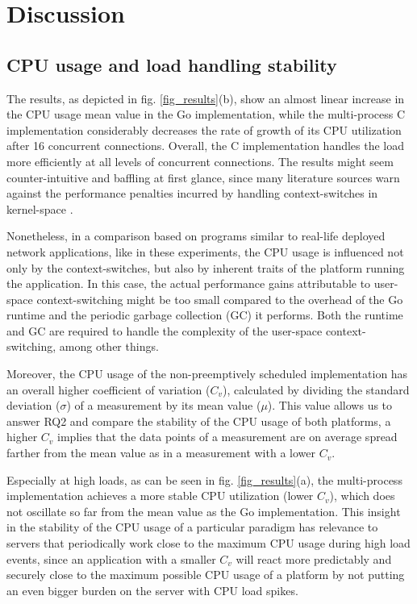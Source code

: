 \section{Discussion}
\subsection{CPU usage and load handling stability}
The results, as depicted in fig. \ref{fig_results}(b), show an almost linear increase in the CPU usage mean value in the Go implementation, while the multi-process C implementation considerably decreases the rate of growth of its CPU utilization after 16 concurrent connections. Overall, the C implementation handles the load more efficiently at all levels of concurrent connections. The results might seem counter-intuitive and baffling at first glance, since many literature sources warn against the performance penalties incurred by handling context-switches in kernel-space \cite{Cox-Buday2017}\cite{Kerrisk2010}. 

Nonetheless, in a comparison based on programs similar to real-life deployed network applications, like in these experiments, the CPU usage is influenced not only by the context-switches, but also by inherent traits of the platform running the application. In this case, the actual performance gains attributable to user-space context-switching might be too small compared to the overhead of the Go runtime and the periodic garbage collection (GC) it performs. Both the runtime and GC are required to handle the complexity of the user-space context-switching, among other things.

Moreover, the CPU usage of the non-preemptively scheduled implementation has an overall higher coefficient of variation ($C_v$), calculated by dividing the standard deviation ($\sigma$) of a measurement by its mean value ($\mu$). This value allows us to answer RQ2 and compare the stability of the CPU usage of both platforms, a higher $C_v$ implies that the data points of a measurement are on average spread farther from the mean value as in a measurement with a lower $C_v$. 

Especially at high loads, as can be seen in fig. \ref{fig_results}(a), the multi-process implementation achieves a more stable CPU utilization (lower $C_v$), which does not oscillate so far from the mean value as the Go implementation. This insight in the stability of the CPU usage of a particular paradigm has relevance to servers that periodically work close to the maximum CPU usage during high load events, since an application with a smaller $C_v$ will react more predictably and securely close to the maximum possible CPU usage of a platform by not putting an even bigger burden on the server with CPU load spikes.

